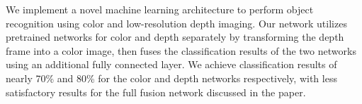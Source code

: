 
We implement a novel machine learning architecture to perform object recognition using color and low-resolution depth imaging. Our network utilizes pretrained networks for color and depth separately by transforming the depth frame into a color image, then fuses the classification results of the two networks using an additional fully connected layer. We achieve classification results of nearly 70\% and 80\% for the color and depth networks respectively, with less satisfactory results for the full fusion network discussed in the paper.
